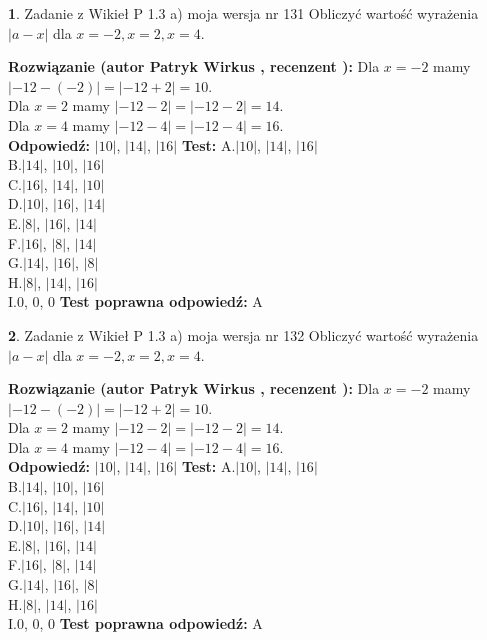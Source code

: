 \documentclass[12pt, a4paper]{article}
\theoremstyle{definition} %
\newtheorem{zad}{}
\newcommand{\zadStart}[1]{\begin{zad}#1\newline}
\newcommand{\zadStop}{\end{zad}}
\newcommand{\rozwStart}[2]{\noindent \textbf{Rozwiązanie (autor #1 , recenzent #2): }\newline}
\newcommand{\rozwStop}{\newline}
\newcommand{\odpStart}{\noindent \textbf{Odpowiedź:}\newline}
\newcommand{\odpStop}{\newline}
\newcommand{\testStart}{\noindent \textbf{Test:}\newline}
\newcommand{\testStop}{\newline}
\newcommand{\kluczStart}{\noindent \textbf{Test poprawna odpowiedź:}\newline}
\newcommand{\kluczStop}{\newline}
\begin{document}
\zadStart{Zadanie z Wikieł P 1.3 a) moja wersja nr 131}
Obliczyć wartość wyrażenia $|a - x|$ dla $x=-2,x=2,x=4$.
\zadStop
\rozwStart{Patryk Wirkus}{}
Dla $x = -2$ mamy $|-12 - (-2)| = |-12 + 2| = 10$.\\
Dla $x = 2$ mamy $|-12 - 2| = |-12 - 2| = 14$.\\
Dla $x = 4$ mamy $|-12 - 4| = |-12 - 4| = 16$.\\
\rozwStop
\odpStart
$|10|$, $|14|$, $|16|$
\odpStop
\testStart
A.$|10|$, $|14|$, $|16|$\\
B.$|14|$, $|10|$, $|16|$\\
C.$|16|$, $|14|$, $|10|$\\
D.$|10|$, $|16|$, $|14|$\\
E.$|8|$, $|16|$, $|14|$\\
F.$|16|$, $|8|$, $|14|$\\
G.$|14|$, $|16|$, $|8|$\\
H.$|8|$, $|14|$, $|16|$\\
I.$0$, $0$, $0$
\testStop
\kluczStart
A
\kluczStop



\zadStart{Zadanie z Wikieł P 1.3 a) moja wersja nr 132}
Obliczyć wartość wyrażenia $|a - x|$ dla $x=-2,x=2,x=4$.
\zadStop
\rozwStart{Patryk Wirkus}{}
Dla $x = -2$ mamy $|-12 - (-2)| = |-12 + 2| = 10$.\\
Dla $x = 2$ mamy $|-12 - 2| = |-12 - 2| = 14$.\\
Dla $x = 4$ mamy $|-12 - 4| = |-12 - 4| = 16$.\\
\rozwStop
\odpStart
$|10|$, $|14|$, $|16|$
\odpStop
\testStart
A.$|10|$, $|14|$, $|16|$\\
B.$|14|$, $|10|$, $|16|$\\
C.$|16|$, $|14|$, $|10|$\\
D.$|10|$, $|16|$, $|14|$\\
E.$|8|$, $|16|$, $|14|$\\
F.$|16|$, $|8|$, $|14|$\\
G.$|14|$, $|16|$, $|8|$\\
H.$|8|$, $|14|$, $|16|$\\
I.$0$, $0$, $0$
\testStop
\kluczStart
A
\kluczStop
\end{document}
